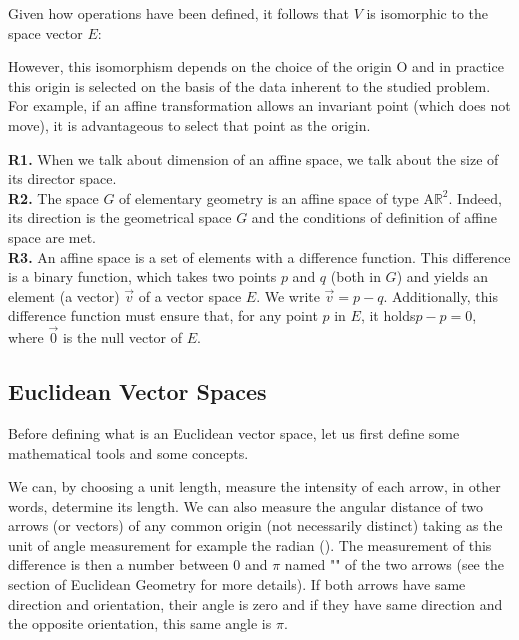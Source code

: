 	Given how operations have been defined, it follows that $V$ is isomorphic to the space vector $E$:
	
	However, this isomorphism depends on the choice of the origin $\text{O}$ and in practice this origin is selected on the basis of the data inherent to the studied problem. For example, if an affine transformation allows an invariant point (which does not move), it is advantageous to select that point as the origin.
	\begin{tcolorbox}[title=Remarks,colframe=black,arc=10pt]
	\textbf{R1.} When we talk about dimension of an affine space, we talk about the size of its director space.\\
	
	\textbf{R2.} The space $G$ of elementary geometry is an affine space of type $\text{A}\mathbb{R}^2$. Indeed, its direction is the geometrical space $G$ and the conditions of definition of affine space are met.\\
	
	\textbf{R3.} An affine space is a set of elements with a difference function. This difference is a binary function, which takes two points $p$ and $q$ (both in $G$) and yields an element (a vector) $\vec{v}$ of a vector space $E$. We write $\vec{v}=p-q.$ Additionally, this difference function must ensure that, for any point $p$ in $E$, it holds$p-p=0$, where $\vec{0}$ is the null vector of $E$.
	\end{tcolorbox}
	
	\pagebreak
	\subsection{Euclidean Vector Spaces}
	Before defining what is an Euclidean vector space, let us first define some mathematical tools and some concepts.
	
	We can, by choosing a unit length, measure the intensity of each arrow, in other words, determine its length. We can also measure the angular distance of two arrows (or vectors) of any common origin (not necessarily distinct) taking as the unit of angle measurement for example the radian (). The measurement of this difference is then a number between $0$ and $\pi$ named "" of the two arrows (see the section of Euclidean Geometry for more details). If both arrows have same direction and orientation, their angle is zero and if they have same direction and the opposite orientation, this same angle is $\pi$.
	
